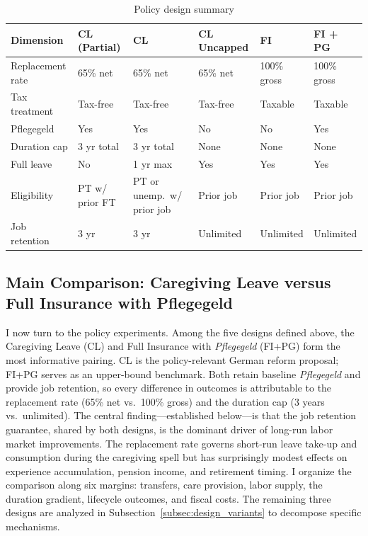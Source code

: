 \begin{table}[htbp]
  \centering
  \caption{Policy design summary}
  \label{tab:policy_design}
  \small
  \begin{tabular}{llllll}
    \toprule
    Dimension & CL (Partial) & CL & CL Uncapped & FI & FI + PG \\
    \midrule
    Replacement rate & 65\% net & 65\% net & 65\% net & 100\% gross & 100\% gross \\
    Tax treatment & Tax-free & Tax-free & Tax-free & Taxable & Taxable \\
    Pflegegeld & Yes & Yes & No & No & Yes \\
    Duration cap & 3 yr total & 3 yr total & None & None & None \\
    Full leave & No & 1 yr max & Yes & Yes & Yes \\
    Eligibility & PT w/ prior FT & PT or unemp.\ w/ prior job & Prior job & Prior job & Prior job \\
    Job retention & 3 yr & 3 yr & Unlimited & Unlimited & Unlimited \\
    \bottomrule
  \end{tabular}
\end{table}

\subsection{Main Comparison: Caregiving Leave versus Full Insurance with Pflegegeld}
\label{subsec:main_comparison}

I now turn to the policy experiments. Among the five designs defined above, the Caregiving Leave (CL) and Full Insurance with \textit{Pflegegeld} (FI+PG) form the most informative pairing. CL is the policy-relevant German reform proposal; FI+PG serves as an upper-bound benchmark. Both retain baseline \textit{Pflegegeld} and provide job retention, so every difference in outcomes is attributable to the replacement rate (65\% net vs.\ 100\% gross) and the duration cap (3 years vs.\ unlimited). The central finding---established below---is that the job retention guarantee, shared by both designs, is the dominant driver of long-run labor market improvements. The replacement rate governs short-run leave take-up and consumption during the caregiving spell but has surprisingly modest effects on experience accumulation, pension income, and retirement timing. I organize the comparison along six margins: transfers, care provision, labor supply, the duration gradient, lifecycle outcomes, and fiscal costs. The remaining three designs are analyzed in Subsection~\ref{subsec:design_variants} to decompose specific mechanisms.

